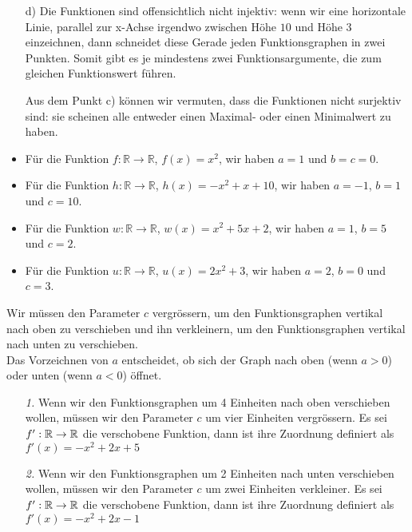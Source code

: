 \documentclass[12pt]{article}
\begin{document}
\begin{solution}
\begin{enumerate}
\item[d)] Die Funktionen sind offensichtlich nicht injektiv: wenn wir eine horizontale Linie, parallel zur x-Achse irgendwo zwischen Höhe $10$ und Höhe $3$ einzeichnen, dann schneidet diese Gerade jeden Funktionsgraphen in zwei Punkten. Somit gibt es je mindestens zwei Funktionsargumente, die zum gleichen Funktionswert führen.

Aus dem Punkt c) können wir vermuten, dass die Funktionen nicht surjektiv sind: sie scheinen alle entweder einen Maximal- oder einen Minimalwert zu haben.
\end{enumerate}
\end{solution}

\begin{solution}
\begin{itemize}
\item Für die Funktion $f:\mathbb{R}\to\mathbb{R}$, $f(x)=x^{2}$, wir haben $a=1$ und $b=c=0$.
\item Für die Funktion $h:\mathbb{R}\to\mathbb{R}$, $h(x)=-x^{2}+x+10$, wir haben $a=-1$, $b=1$ und $c=10$.
\item Für die Funktion $w:\mathbb{R}\to\mathbb{R}$, $w(x)=x^{2}+5x+2$, wir haben $a=1$, $b=5$ und $c=2$.
\item Für die Funktion $u:\mathbb{R}\to\mathbb{R}$, $u(x)=2x^{2}+3$, wir haben $a=2$, $b=0$ und $c=3$.
\end{itemize}
\end{solution}
\begin{solution}
Wir müssen den Parameter $c$ vergrössern, um den Funktionsgraphen vertikal nach oben zu verschieben und ihn verkleinern, um den Funktionsgraphen vertikal nach unten zu verschieben. \\
Das Vorzeichnen von $a$ entscheidet, ob sich der Graph nach oben (wenn $a>0$) oder unten (wenn $a<0$) öffnet.
\end{solution}


\begin{solution}
\begin{enumerate}
\item[\emph{1.}] Wenn wir den Funktionsgraphen um 4 Einheiten nach oben verschieben wollen, müssen wir den Parameter $c$ um vier Einheiten vergrössern. Es sei $f': \mathbb{R} \rightarrow \mathbb{R}$ die verschobene Funktion, dann ist ihre Zuordnung definiert als $f'(x) = -x^2 + 2x + 5$


\item[\emph{2.}] Wenn wir den Funktionsgraphen um 2 Einheiten nach unten verschieben wollen, müssen wir den Parameter $c$ um zwei Einheiten verkleiner. Es sei $f': \mathbb{R} \rightarrow \mathbb{R}$ die verschobene Funktion, dann ist ihre Zuordnung definiert als $f'(x) = -x^2 + 2x -1$
\end{enumerate}
\end{solution}
\end{document}
